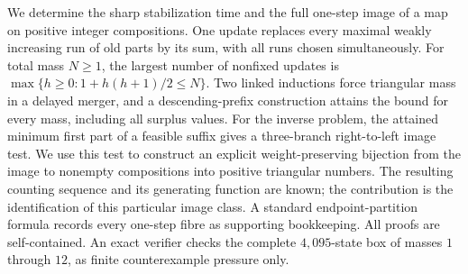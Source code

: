 We determine the sharp stabilization time and the full one-step image of a
map on positive integer compositions. One update replaces every maximal
weakly increasing run of old parts by its sum, with all runs chosen
simultaneously. For total mass $N\ge1$, the largest number of nonfixed
updates is $\max\{h\ge0:1+h(h+1)/2\le N\}$. Two linked inductions force
triangular mass in a delayed merger, and a descending-prefix construction
attains the bound for every mass, including all surplus values. For the
inverse problem, the attained minimum first part of a feasible suffix
gives a three-branch right-to-left image test. We use this test to construct
an explicit weight-preserving bijection from the image to nonempty
compositions into positive triangular numbers. The resulting counting
sequence and its generating function are known; the contribution is the
identification of this particular image class. A standard endpoint-partition
formula records every one-step fibre as supporting bookkeeping. All proofs
are self-contained. An exact verifier checks the complete $4{,}095$-state
box of masses $1$ through $12$, as finite counterexample pressure only.
